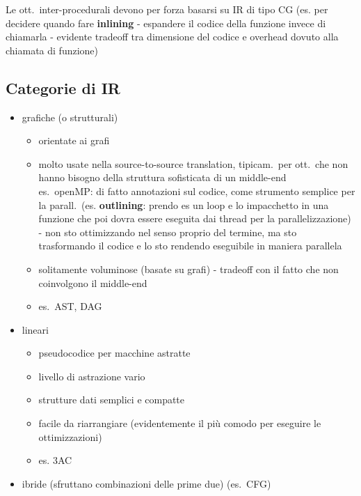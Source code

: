 \vspace{-1em}
\begin{emphasize}
  Le ott.~inter-procedurali devono per forza basarsi su IR di tipo CG (es. per decidere quando fare \textbf{inlining} - espandere il codice della funzione invece di chiamarla - evidente tradeoff tra dimensione del codice e overhead dovuto alla chiamata di funzione)
\end{emphasize}

\subsection{Categorie di IR}

\begin{itemize}
  \item grafiche (o strutturali)
    \begin{itemize}
      \item orientate ai grafi
      \item molto usate nella source-to-source translation, tipicam.~per ott.~che non hanno bisogno della struttura sofisticata di un middle-end\\
        es.~openMP: di fatto annotazioni sul codice, come strumento semplice per la parall.~(es. \textbf{outlining}: prendo es un loop e lo impacchetto in una funzione che poi dovra essere eseguita dai thread per la parallelizzazione) - non sto ottimizzando nel senso proprio del termine, ma sto trasformando il codice e lo sto rendendo eseguibile in maniera parallela
      \item solitamente voluminose (basate su grafi) - tradeoff con il fatto che non coinvolgono il middle-end
      \item es.~AST, DAG
    \end{itemize}
  \item lineari
    \begin{itemize}
      \item pseudocodice per macchine astratte
      \item livello di astrazione vario
      \item strutture dati semplici e compatte
      \item facile da riarrangiare (evidentemente il pi\`u comodo per eseguire le ottimizzazioni)
      \item es. 3AC
    \end{itemize}
  \item ibride (sfruttano combinazioni delle prime due) (es.~CFG)
\end{itemize}
